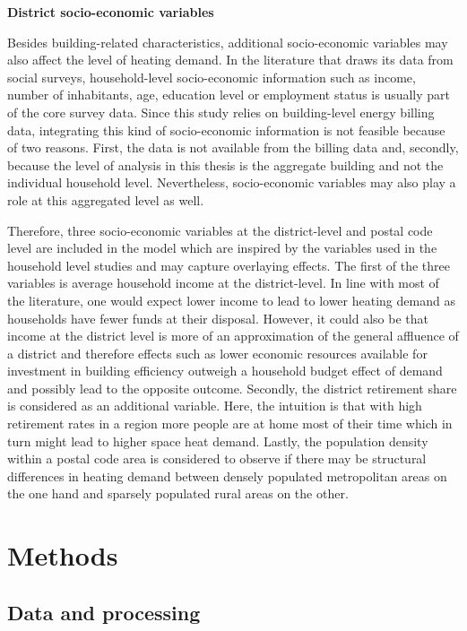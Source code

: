 \documentclass[12pt,twoside]{reedthesis}
\begin{document}
\textbf{District socio-economic variables}

Besides building-related characteristics, additional socio-economic variables may also affect the level of heating demand. In the literature that draws its data from social surveys, household-level socio-economic information such as income, number of inhabitants, age, education level or employment status is usually part of the core survey data. Since this study relies on building-level energy billing data, integrating this kind of socio-economic information is not feasible because of two reasons. First, the data is not available from the billing data and, secondly, because the level of analysis in this thesis is the aggregate building and not the individual household level. Nevertheless, socio-economic variables may also play a role at this aggregated level as well.

Therefore, three socio-economic variables at the district-level and postal code level are included in the model which are inspired by the variables used in the household level studies and may capture overlaying effects. The first of the three variables is average household income at the district-level. In line with most of the literature, one would expect lower income to lead to lower heating demand as households have fewer funds at their disposal. However, it could also be that income at the district level is more of an approximation of the general affluence of a district and therefore effects such as lower economic resources available for investment in building efficiency outweigh a household budget effect of demand and possibly lead to the opposite outcome. Secondly, the district retirement share is considered as an additional variable. Here, the intuition is that with high retirement rates in a region more people are at home most of their time which in turn might lead to higher space heat demand. Lastly, the population density within a postal code area is considered to observe if there may be structural differences in heating demand between densely populated metropolitan areas on the one hand and sparsely populated rural areas on the other.

\hypertarget{methods}{%
\chapter{Methods}\label{methods}}

\hypertarget{data}{%
\section{Data and processing}\label{data}}
\end{document}
